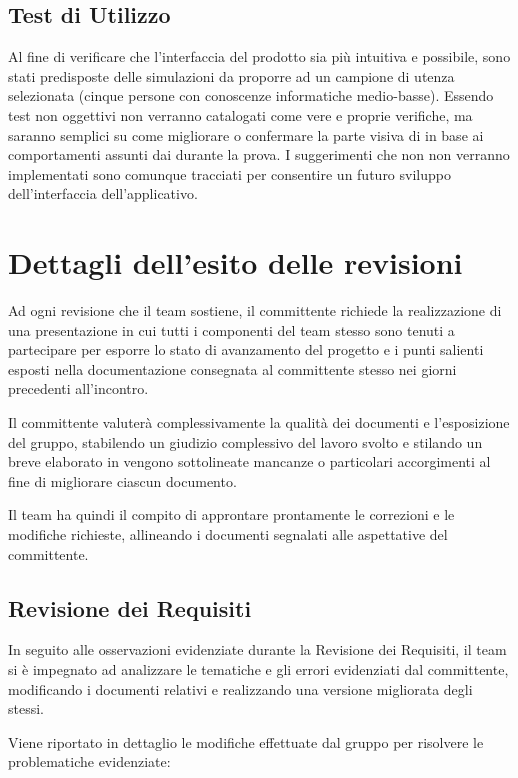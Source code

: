 \subsection{Test di Utilizzo}
Al fine di verificare che l'interfaccia del prodotto sia più intuitiva e  possibile, sono stati predisposte delle simulazioni da proporre ad un campione di utenza selezionata (cinque persone con conoscenze informatiche medio-basse).
Essendo test non oggettivi non verranno catalogati come vere e proprie verifiche, ma saranno semplici  su come migliorare o confermare la parte visiva di \caName in base ai comportamenti assunti dai  durante la prova.
I suggerimenti che non non verranno implementati sono comunque tracciati per consentire un futuro sviluppo dell'interfaccia dell'applicativo.


\clearpage

\section{Dettagli dell'esito delle revisioni}
Ad ogni revisione che il team sostiene, il committente richiede la realizzazione di una presentazione in cui tutti i componenti del team stesso sono tenuti a partecipare per esporre lo stato di avanzamento del progetto e i punti salienti esposti nella documentazione consegnata al committente stesso nei giorni precedenti all'incontro.

Il committente valuterà complessivamente la qualità dei documenti e l'esposizione del gruppo, stabilendo un giudizio complessivo del lavoro svolto e stilando un breve elaborato in vengono sottolineate mancanze o particolari accorgimenti al fine di migliorare ciascun documento.

Il team ha quindi il compito di approntare prontamente le correzioni e le modifiche richieste, allineando i documenti segnalati alle aspettative del committente.

\subsection{Revisione dei Requisiti}
In seguito alle osservazioni evidenziate durante la Revisione dei Requisiti, il team si è impegnato ad analizzare le tematiche e gli errori evidenziati dal committente, modificando i documenti relativi e realizzando una versione migliorata degli stessi.

Viene riportato in dettaglio le modifiche effettuate dal gruppo per risolvere le problematiche evidenziate:

